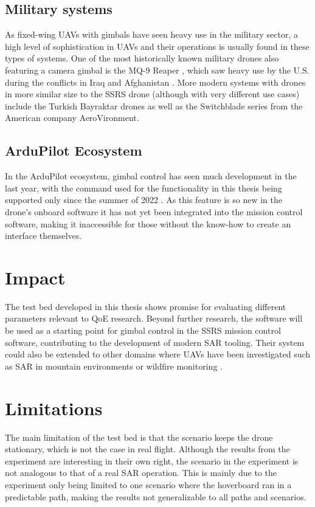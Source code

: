 \documentclass[nofilelist]{cslthse-msc}
\begin{document}
\subsection{Military systems}
As fixed-wing UAVs with gimbals have seen heavy use in the military sector, a high level of sophistication in UAVs and their operations is usually found in these types of systems. One of the most historically known military drones also featuring a camera gimbal is the MQ-9 Reaper \cite{mq9reaper}, which saw heavy use by the U.S. during the conflicts in Iraq and Afghanistan \cite{mq9reaper-wiki}. More modern systems with drones in more similar size to the SSRS drone (although with very different use cases) include the Turkish Bayraktar drones \cite{bayraktar-wiki} as well as the Switchblade series \cite{switchblade} from the American company AeroVironment.

\subsection{ArduPilot Ecosystem}
In the ArduPilot ecosystem, gimbal control has seen much development in the last year, with the command used for the functionality in this thesis being supported only since the summer of 2022 \cite{ardupilot-gimbal-issue}. As this feature is so new in the drone's onboard software it has not yet been integrated into the mission control software, making it inaccessible for those without the know-how to create an interface themselves.

\section{Impact}
The test bed developed in this thesis shows promise for evaluating different parameters relevant to QoE research. Beyond further research, the software will be used as a starting point for gimbal control in the SSRS mission control software, contributing to the development of modern SAR tooling. Their system could also be extended to other domains where UAVs have been investigated such as SAR in mountain environments \cite{drones-mountain-sar} or wildfire monitoring \cite{drones-wildfire}.

\section{Limitations}
The main limitation of the test bed is that the scenario keeps the drone stationary, which is not the case in real flight. Although the results from the experiment are interesting in their own right, the scenario in the experiment is not analogous to that of a real SAR operation. This is mainly due to the experiment only being limited to one scenario where the hoverboard ran in a predictable path, making the results not generalizable to all paths and scenarios.
\end{document}
